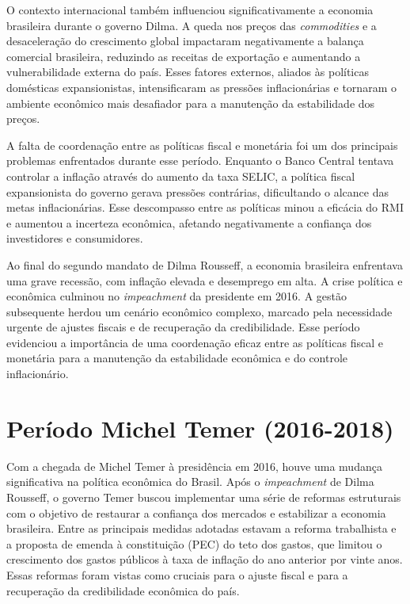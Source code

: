 \documentclass[12pt,oneside,a4paper,chapter=TITLE,english,brazil,sumario=abnt-6027-2012]{abntex2}
\begin{document}
O contexto internacional também influenciou significativamente a economia brasileira durante o governo Dilma. A queda nos preços das \textit{commodities} e a desaceleração do crescimento global impactaram negativamente a balança comercial brasileira, reduzindo as receitas de exportação e aumentando a vulnerabilidade externa do país. Esses fatores externos, aliados às políticas domésticas expansionistas, intensificaram as pressões inflacionárias e tornaram o ambiente econômico mais desafiador para a manutenção da estabilidade dos preços.

A falta de coordenação entre as políticas fiscal e monetária foi um dos principais problemas enfrentados durante esse período. Enquanto o Banco Central tentava controlar a inflação através do aumento da taxa SELIC, a política fiscal expansionista do governo gerava pressões contrárias, dificultando o alcance das metas inflacionárias. Esse descompasso entre as políticas minou a eficácia do RMI e aumentou a incerteza econômica, afetando negativamente a confiança dos investidores e consumidores.

Ao final do segundo mandato de Dilma Rousseff, a economia brasileira enfrentava uma grave recessão, com inflação elevada e desemprego em alta. A crise política e econômica culminou no \textit{impeachment} da presidente em 2016. A gestão subsequente herdou um cenário econômico complexo, marcado pela necessidade urgente de ajustes fiscais e de recuperação da credibilidade. Esse período evidenciou a importância de uma coordenação eficaz entre as políticas fiscal e monetária para a manutenção da estabilidade econômica e do controle inflacionário.

\section{Período Michel Temer (2016-2018)}

Com a chegada de Michel Temer à presidência em 2016, houve uma mudança significativa na política econômica do Brasil. Após o \textit{impeachment} de Dilma Rousseff, o governo Temer buscou implementar uma série de reformas estruturais com o objetivo de restaurar a confiança dos mercados e estabilizar a economia brasileira. Entre as principais medidas adotadas estavam a reforma trabalhista e a  proposta de emenda à constituição (PEC) do teto dos gastos, que limitou o crescimento dos gastos públicos à taxa de inflação do ano anterior por vinte anos. Essas reformas foram vistas como cruciais para o ajuste fiscal e para a recuperação da credibilidade econômica do país.
\end{document}
